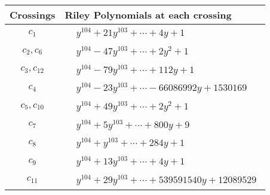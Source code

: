 \documentclass[1p]{elsarticle_modified}
\theoremstyle{definition}
\begin{document}
\begin{tabular}{m{50pt}|m{274pt}}
Crossings & \hspace{64pt}Riley Polynomials at each crossing \\
\hline $$\begin{aligned}c_{1}\end{aligned}$$&$\begin{aligned}
&y^{104}+21 y^{103}+\cdots+4 y+1
\end{aligned}$\\
\hline $$\begin{aligned}c_{2},c_{6}\end{aligned}$$&$\begin{aligned}
&y^{104}-47 y^{103}+\cdots+2 y^2+1
\end{aligned}$\\
\hline $$\begin{aligned}c_{3},c_{12}\end{aligned}$$&$\begin{aligned}
&y^{104}-79 y^{103}+\cdots+112 y+1
\end{aligned}$\\
\hline $$\begin{aligned}c_{4}\end{aligned}$$&$\begin{aligned}
&y^{104}-23 y^{103}+\cdots-66086992 y+1530169
\end{aligned}$\\
\hline $$\begin{aligned}c_{5},c_{10}\end{aligned}$$&$\begin{aligned}
&y^{104}+49 y^{103}+\cdots+2 y^2+1
\end{aligned}$\\
\hline $$\begin{aligned}c_{7}\end{aligned}$$&$\begin{aligned}
&y^{104}+5 y^{103}+\cdots+800 y+9
\end{aligned}$\\
\hline $$\begin{aligned}c_{8}\end{aligned}$$&$\begin{aligned}
&y^{104}+y^{103}+\cdots+284 y+1
\end{aligned}$\\
\hline $$\begin{aligned}c_{9}\end{aligned}$$&$\begin{aligned}
&y^{104}+13 y^{103}+\cdots+4 y+1
\end{aligned}$\\
\hline $$\begin{aligned}c_{11}\end{aligned}$$&$\begin{aligned}
&y^{104}+29 y^{103}+\cdots+539591540 y+12089529
\end{aligned}$\\
\hline
\end{tabular}\\~\\
\end{document}
